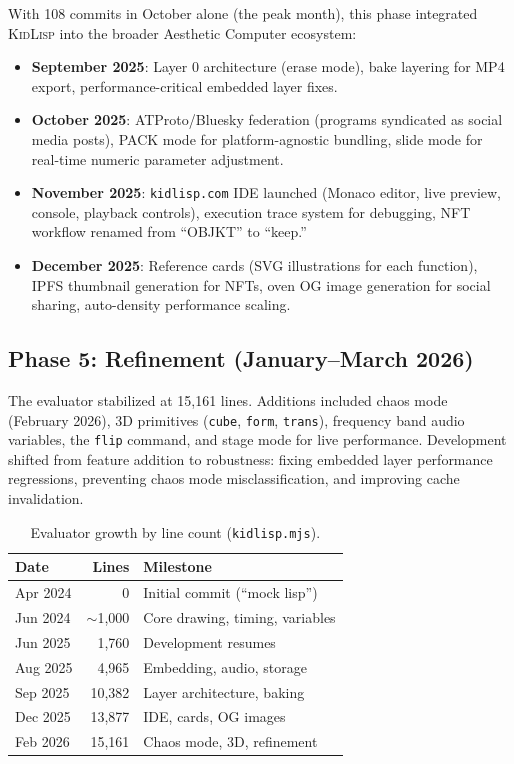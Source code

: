 \documentclass[10pt,letterpaper,twocolumn]{article}
\newcommand{\kidlisp}{\textsc{KidLisp}}
\begin{document}
With 108 commits in October alone (the peak month), this phase integrated \kidlisp{} into the broader Aesthetic Computer ecosystem:

\begin{itemize}
  \item \textbf{September 2025}: Layer 0 architecture (erase mode), bake layering for MP4 export, performance-critical embedded layer fixes.
  \item \textbf{October 2025}: ATProto/Bluesky federation (programs syndicated as social media posts), PACK mode for platform-agnostic bundling, slide mode for real-time numeric parameter adjustment.
  \item \textbf{November 2025}: \texttt{kidlisp.com} IDE launched (Monaco editor, live preview, console, playback controls), execution trace system for debugging, NFT workflow renamed from ``OBJKT'' to ``keep.''
  \item \textbf{December 2025}: Reference cards (SVG illustrations for each function), IPFS thumbnail generation for NFTs, oven OG image generation for social sharing, auto-density performance scaling.
\end{itemize}

\subsection{Phase 5: Refinement (January--March 2026)}

The evaluator stabilized at 15,161 lines. Additions included chaos mode (February 2026), 3D primitives (\texttt{cube}, \texttt{form}, \texttt{trans}), frequency band audio variables, the \texttt{flip} command, and stage mode for live performance. Development shifted from feature addition to robustness: fixing embedded layer performance regressions, preventing chaos mode misclassification, and improving cache invalidation.

\begin{table}[h]
\small
\centering
\begin{tabular}{lrl}
\toprule
\textbf{Date} & \textbf{Lines} & \textbf{Milestone} \\
\midrule
Apr 2024 & 0 & Initial commit (``mock lisp'') \\
Jun 2024 & $\sim$1{,}000 & Core drawing, timing, variables \\
Jun 2025 & 1{,}760 & Development resumes \\
Aug 2025 & 4{,}965 & Embedding, audio, storage \\
Sep 2025 & 10{,}382 & Layer architecture, baking \\
Dec 2025 & 13{,}877 & IDE, cards, OG images \\
Feb 2026 & 15{,}161 & Chaos mode, 3D, refinement \\
\bottomrule
\end{tabular}
\caption{Evaluator growth by line count (\texttt{kidlisp.mjs}).}
\label{tab:growth}
\end{table}
\end{document}
